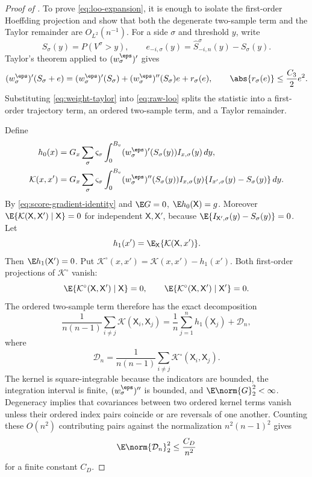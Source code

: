 \begin{proof}[Proof of ]
To prove \eqref{eq:loo-expansion}, it is enough to isolate the first-order Hoeffding projection and show that both the degenerate two-sample term and the Taylor remainder are $O_{L^2}(n^{-1})$.  For a side $\sigma$ and threshold $y$, write
\[
 S_\sigma(y)=P(V^\sigma>y),
 \qquad
 e_{-i,\sigma}(y)=\widehat S_{-i,n}^\sigma(y)-S_\sigma(y).
\]
Taylor's theorem applied to $(w_\sigma^\eps)'$ gives
\begin{equation}\label{eq:weight-taylor}
 (w_\sigma^\eps)'(S_\sigma+e)
 =(w_\sigma^\eps)'(S_\sigma)
 +(w_\sigma^\eps)''(S_\sigma)e
 +r_\sigma(e),
 \qquad
 \abs{r_\sigma(e)}\le\frac{C_3}{2}e^2.
\end{equation}
Substituting \eqref{eq:weight-taylor} into \eqref{eq:raw-loo} splits the statistic into a first-order trajectory term, an ordered two-sample term, and a Taylor remainder.

Define
\begin{align*}
 h_0(x)
 &=G_x\sum_\sigma \varsigma_\sigma
 \int_0^{B_v}(w_\sigma^\eps)'(S_\sigma(y))I_{x,\sigma}(y)\,dy,\\
 \mathcal K(x,x')
 &=G_x\sum_\sigma \varsigma_\sigma
 \int_0^{B_v}(w_\sigma^\eps)''(S_\sigma(y))
 I_{x,\sigma}(y)\{I_{x',\sigma}(y)-S_\sigma(y)\}\,dy.
\end{align*}
By \eqref{eq:score-gradient-identity} and $\E G=0$, $\E h_0(\mathsf X)=g$.  Moreover
$\E\{\mathcal K(\mathsf X,\mathsf X')\mid \mathsf X\}=0$ for independent $\mathsf X,\mathsf X'$, because
$\E\{I_{\mathsf X',\sigma}(y)-S_\sigma(y)\}=0$.  Let
\[
 h_1(x')=\E_{\mathsf X}\{\mathcal K(\mathsf X,x')\}.
\]
Then $\E h_1(\mathsf X')=0$.  Put
$\mathcal K^\circ(x,x')=\mathcal K(x,x')-h_1(x')$.  Both first-order projections of $\mathcal K^\circ$ vanish:
\[
 \E\{\mathcal K^\circ(\mathsf X,\mathsf X')\mid \mathsf X\}=0,
 \qquad
 \E\{\mathcal K^\circ(\mathsf X,\mathsf X')\mid \mathsf X'\}=0.
\]
The ordered two-sample term therefore has the exact decomposition
\begin{equation}\label{eq:ordered-hoeffding}
 \frac{1}{n(n-1)}\sum_{i\ne j}\mathcal K(\mathsf X_i,\mathsf X_j)
 =\frac1n\sum_{j=1}^{n}h_1(\mathsf X_j)
 +\mathcal D_n,
\end{equation}
where
\[
 \mathcal D_n=\frac{1}{n(n-1)}\sum_{i\ne j}\mathcal K^\circ(\mathsf X_i,\mathsf X_j).
\]
The kernel is square-integrable because the indicators are bounded, the integration interval is finite, $(w_\sigma^\eps)''$ is bounded, and $\E\norm{G}_2^2<\infty$.  Degeneracy implies that covariances between two ordered kernel terms vanish unless their ordered index pairs coincide or are reversals of one another.  Counting these $O(n^2)$ contributing pairs against the normalization $n^2(n-1)^2$ gives
\begin{equation}\label{eq:degenerate-remainder}
 \E\norm{\mathcal D_n}_2^2\le\frac{C_D}{n^2}
\end{equation}
for a finite constant $C_D$.


\end{proof}
